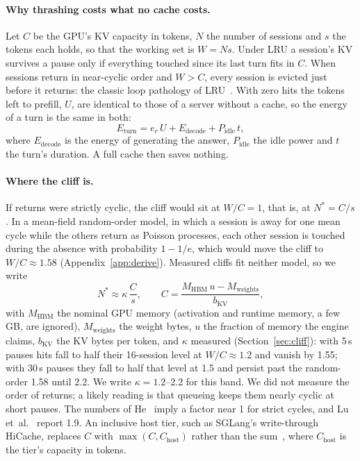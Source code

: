 \paragraph{Why thrashing costs what no cache costs.} Let $C$ be the GPU's KV capacity in tokens, $N$ the
number of sessions and $s$ the tokens each holds, so that the working set is $W=Ns$. Under LRU a session's KV
survives a pause only if everything touched since its last turn fits in $C$. When sessions return in near-cyclic order
and $W > C$, every session is evicted just before it returns: the classic loop pathology of
LRU~\cite{jiang2002lirs}. With zero hits the tokens left to prefill, $U$, are identical to those of a
server without a cache, so the energy of a turn is the same in both:
\begin{equation}
  E_{\text{turn}} = e_r\,U + E_{\text{decode}} + P_{\text{idle}}\,t,
  \label{eq:turn}
\end{equation}
where $E_{\text{decode}}$ is the energy of generating the answer, $P_{\text{idle}}$ the idle power and $t$ the turn's duration. A full cache then saves nothing.

\paragraph{Where the cliff is.} If returns were strictly cyclic, the cliff would sit at $W/C=1$, that is,
at $N^\ast=C/s$. In a mean-field random-order model, in which a session is away for one mean cycle while the others return as
Poisson processes, each other session is touched during the absence with probability $1-1/e$, which would move the
cliff to $W/C\approx1.58$ (Appendix~\ref{app:derive}). Measured cliffs fit neither model, so we write
\begin{equation}
  N^\ast \approx \kappa\,\frac{C}{s},\qquad C = \frac{M_{\text{HBM}}\,u - M_{\text{weights}}}{b_{\text{KV}}},
  \label{eq:cliff}
\end{equation}
with $M_{\text{HBM}}$ the nominal GPU memory (activation and runtime memory, a few GB, are ignored), $M_{\text{weights}}$ the weight bytes, $u$ the fraction of memory the engine
claims, $b_{\text{KV}}$ the KV bytes per token, and $\kappa$ measured
(Section~\ref{sec:cliff}): with 5\,s pauses hits fall to half their 16-session level at $W/C\approx1.2$ and vanish by 1.55; with 30\,s pauses they fall to half that level at
1.5 and persist past the random-order 1.58 until 2.2. We write $\kappa=1.2$--2.2 for this band. We did not measure
the order of returns; a likely reading is that queueing keeps them nearly cyclic at short pauses. The
numbers of He~\cite{he2026robot} imply a factor near 1 for strict cycles, and Lu et~al.~\cite{lu2026metastability} report 1.9.
An inclusive host tier, such as SGLang's write-through HiCache, replaces $C$ with $\max(C, C_{\text{host}})$ rather than
the sum~\cite{lu2026metastability}, where $C_{\text{host}}$ is the tier's capacity in tokens.

